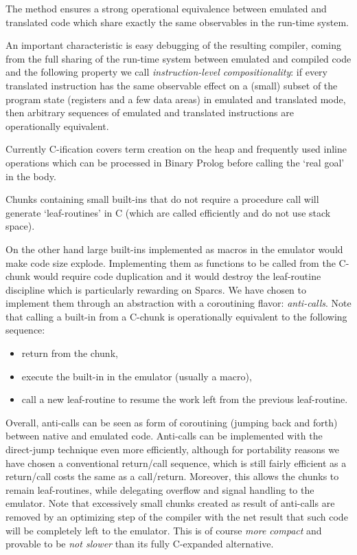 \documentclass{article}
\begin{document}
The method ensures a strong operational equivalence between
emulated and translated code which share exactly the same
observables in the run-time system.

An important characteristic is easy debugging of the resulting
compiler, coming from the full sharing
of the run-time system between emulated and compiled code
and the following property we call
{\em instruction-level compositionality}:
if every translated instruction has the same observable effect on
a (small) subset of
the program state (registers and a few data areas)
in emulated and translated mode, then 
arbitrary sequences of emulated and translated
instructions are operationally equivalent.

Currently C-ification covers term creation on the heap
and  frequently used
inline operations which can be processed
in Binary Prolog before calling the `real goal' in the body.

Chunks containing small built-ins that do not 
require a procedure call will
generate `leaf-routines' in C (which are called
efficiently and do not use stack space).

On the other hand large built-ins implemented as macros in the emulator
would make code size explode.
Implementing them as functions  to be called
from the C-chunk would
require code duplication and it would destroy
the leaf-routine discipline
which is particularly rewarding on Sparcs.
We have chosen
to implement them through an
abstraction with a coroutining flavor: {\em anti-calls}.
Note that calling a built-in from a C-chunk is operationally
equivalent to the following sequence:

\begin{itemize}
\item return from the chunk, 
\item execute the built-in in the emulator (usually a macro),
\item call a new leaf-routine to resume the work left from the
      previous leaf-routine.
\end{itemize}

Overall, anti-calls can be seen as form of coroutining
(jumping back and forth) between native
and emulated code.
Anti-calls can be implemented with the direct-jump technique
even more efficiently,
although for portability
reasons we have chosen a conventional return/call sequence,
which is still fairly efficient
as a return/call costs the same as a call/return.
Moreover, this allows the chunks to remain leaf-routines,
while delegating
overflow and signal handling
to the emulator. Note that
excessively small chunks created as result
of anti-calls are removed by an optimizing step
of the compiler with the net result
that such code will be completely left to
the emulator. This is of course
{\em more compact} and provable to be {\em not
slower} than its fully C-expanded alternative.
\end{document}
